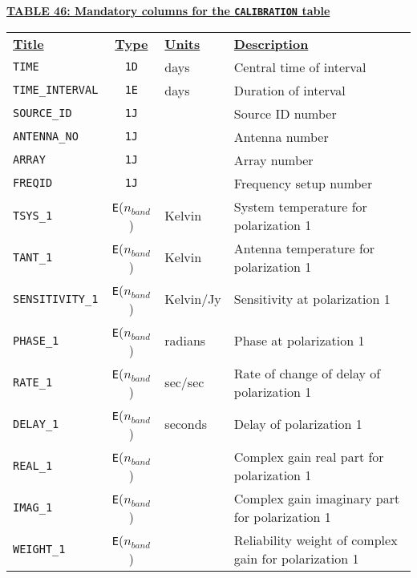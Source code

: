 \documentclass[twoside]{article}
\newcommand{\nband}{$n_{band}$}
\begin{document}
\begin{center}
\underline{\bf{TABLE 46: Mandatory columns for the {\tt CALIBRATION}
    table}}\\
\begin{tabular}{lcll}
\noalign{\vspace{2pt}}
\underline{{\bf Title\vphantom{y}}} & \underline{\bf{Type}} &
   \underline{{\bf Units\vphantom{y}}} & \underline{\bf{Description}} \\
\noalign{\vspace{2pt}}
{\tt TIME}        & {\tt 1D} & days  & Central time of interval \\
{\tt TIME\_INTERVAL} & {\tt 1E} & days & Duration of interval \\
{\tt SOURCE\_ID}  & {\tt 1J} &       & Source ID number \\
{\tt ANTENNA\_NO} & {\tt 1J} &       & Antenna number \\
{\tt ARRAY}       & {\tt 1J} &       & Array number \\
{\tt FREQID}      & {\tt 1J} &       & Frequency setup number \\
{\tt TSYS\_1}     & {\tt E}(\nband) & Kelvin & System temperature for
                                      polarization 1 \\
{\tt TANT\_1}     & {\tt E}(\nband) & Kelvin & Antenna temperature for
                                      polarization 1 \\
{\tt SENSITIVITY\_1} & {\tt E}(\nband) & Kelvin/Jy & Sensitivity at
                                      polarization 1 \\
{\tt PHASE\_1}    & {\tt E}(\nband) & radians & Phase at
                                      polarization 1 \\
{\tt RATE\_1}     & {\tt E}(\nband) & sec/sec & Rate of change of
                                      delay of polarization 1 \\
{\tt DELAY\_1}    & {\tt E}(\nband) & seconds & Delay of
                                      polarization 1 \\
{\tt REAL\_1}     & {\tt E}(\nband) &         & Complex gain real part
                                      for polarization 1 \\
{\tt IMAG\_1}     & {\tt E}(\nband) &         & Complex gain imaginary
                                      part for polarization 1 \\
{\tt WEIGHT\_1}   & {\tt E}(\nband) &         & Reliability weight of
                                      complex gain for polarization 1 \\

\end{tabular}
\end{center}
\end{document}
